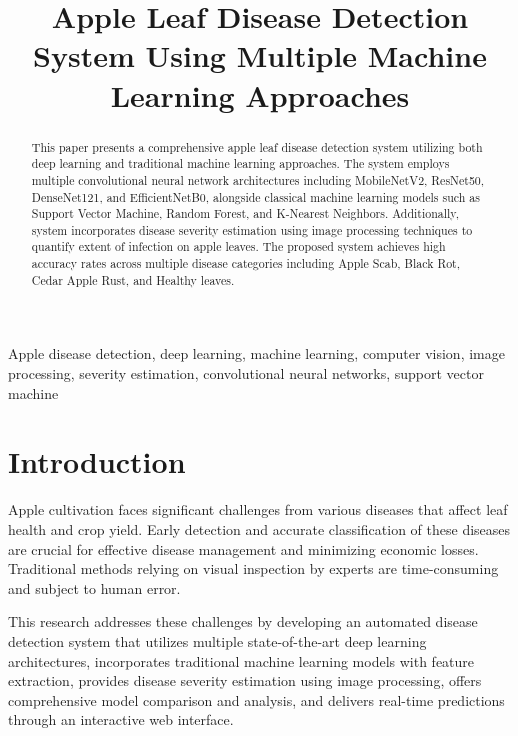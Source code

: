 \documentclass[conference]{IEEEtran}
\begin{document}
\title{Apple Leaf Disease Detection System Using Multiple Machine Learning Approaches}

\author{
}

\maketitle

\begin{abstract}
This paper presents a comprehensive apple leaf disease detection system utilizing both deep learning and traditional machine learning approaches. The system employs multiple convolutional neural network architectures including MobileNetV2, ResNet50, DenseNet121, and EfficientNetB0, alongside classical machine learning models such as Support Vector Machine, Random Forest, and K-Nearest Neighbors. Additionally, system incorporates disease severity estimation using image processing techniques to quantify extent of infection on apple leaves. The proposed system achieves high accuracy rates across multiple disease categories including Apple Scab, Black Rot, Cedar Apple Rust, and Healthy leaves.
\end{abstract}

\begin{IEEEkeywords}
Apple disease detection, deep learning, machine learning, computer vision, image processing, severity estimation, convolutional neural networks, support vector machine
\end{IEEEkeywords}

\section{Introduction}
Apple cultivation faces significant challenges from various diseases that affect leaf health and crop yield. Early detection and accurate classification of these diseases are crucial for effective disease management and minimizing economic losses. Traditional methods relying on visual inspection by experts are time-consuming and subject to human error.

This research addresses these challenges by developing an automated disease detection system that utilizes multiple state-of-the-art deep learning architectures, incorporates traditional machine learning models with feature extraction, provides disease severity estimation using image processing, offers comprehensive model comparison and analysis, and delivers real-time predictions through an interactive web interface.
\end{document}
